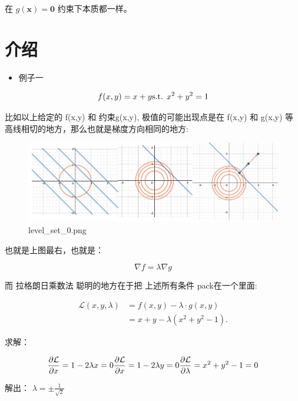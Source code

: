 \documentclass[
]{book}
\providecommand{\tightlist}{%
  \setlength{\itemsep}{0pt}\setlength{\parskip}{0pt}}
\begin{document}
在 \(g(\mathbf{x}) = \mathbf{0}\) 约束下本质都一样。

\hypertarget{ux4ecbux7ecd}{%
\section{介绍}\label{ux4ecbux7ecd}}

\begin{itemize}
\tightlist
\item
  例子一
\end{itemize}

\[
f(x,y) = x + y \\
\text{s.t. }  x^2 + y^2 = 1 \\
\]

比如以上给定的 f(x,y) 和 约束g(x,y), 极值的可能出现点是在 f(x,y) 和 g(x,y) 等高线相切的地方，那么也就是梯度方向相同的地方:

\begin{figure}
\centering
\includegraphics{images/level_set_0.png}
\caption{level\_set\_0.png}
\end{figure}

也就是上图最右，也就是：

\[
\nabla f = \lambda \nabla g
\]

而 拉格朗日乘数法 聪明的地方在于把 上述所有条件 pack在一个里面:

\[{\displaystyle {\begin{aligned}{\mathcal {L}}(x,y,\lambda )&=f(x,y) - \lambda \cdot g(x,y)\\[4pt]&=x+y - \lambda (x^{2}+y^{2}-1).\end{aligned}}}\]

求解：

\[
\frac{\partial \mathcal{L}}{\partial x} = 1 - 2 \lambda x = 0 \\
\frac{\partial \mathcal{L}}{\partial x} = 1 - 2 \lambda y = 0 \\
\frac{\partial \mathcal{L}}{\partial \lambda} = x^2 + y^2 - 1 = 0
\]

解出： \(\lambda = \pm\frac{1}{\sqrt{2}}\)
\end{document}
